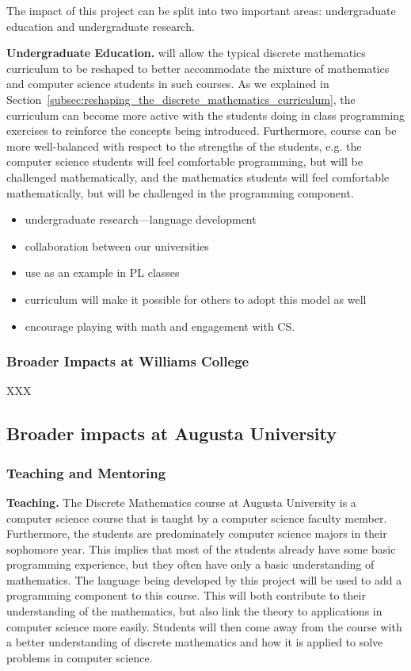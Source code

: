 The impact of this project can be split into two important areas:
undergraduate education and undergraduate research.

\textbf{Undergraduate Education.}  \thelang{} will allow the typical
discrete mathematics curriculum to be reshaped to better accommodate
the mixture of mathematics and computer science students in such
courses.  As we explained in
Section~\ref{subsec:reshaping_the_discrete_mathematics_curriculum},
the curriculum can become more active with the students doing in class
programming exercises to reinforce the concepts being introduced.
Furthermore, course can be more well-balanced with respect to the
strengths of the students, e.g. the computer science students will
feel comfortable programming, but will be challenged mathematically,
and the mathematics students will feel comfortable mathematically, but
will be challenged in the programming component.

\begin{itemize}
\item undergraduate research---language development
\item collaboration between our universities
\item use as an example in PL classes
\item curriculum will make it possible for others to adopt this model
  as well
\item encourage playing with math and engagement with CS.
\end{itemize}

\subsubsection{Broader Impacts at Williams College}
\label{subsec:broader_impacts_at_williams_college}
XXX

\subsection{Broader impacts at Augusta University}
\label{subsec:broader_impacts_at_augusta_university}

\subsubsection{Teaching and Mentoring}
\label{subsec:teaching_and_mentoring}

\textbf{Teaching.}  The Discrete Mathematics course at Augusta
University is a computer science course that is taught by a computer
science faculty member.  Furthermore, the students are predominately
computer science majors in their sophomore year.  This implies that
most of the students already have some basic programming experience,
but they often have only a basic understanding of mathematics.  The
language being developed by this project will be used to add a
programming component to this course.  This will both contribute to
their understanding of the mathematics, but also link the theory to
applications in computer science more easily.  Students will then come
away from the course with a better understanding of discrete
mathematics and how it is applied to solve problems in computer
science.


